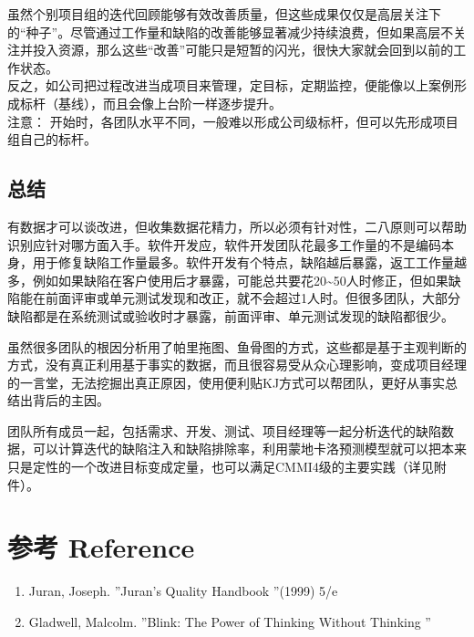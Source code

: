 虽然个别项目组的迭代回顾能够有效改善质量，但这些成果仅仅是高层关注下的``种子''。尽管通过工作量和缺陷的改善能够显著减少持续浪费，但如果高层不关注并投入资源，那么这些``改善''可能只是短暂的闪光，很快大家就会回到以前的工作状态。\\
反之，如公司把过程改进当成项目来管理，定目标，定期监控，便能像以上案例形成标杆（基线），而且会像上台阶一样逐步提升。\\
注意：
开始时，各团队水平不同，一般难以形成公司级标杆，但可以先形成项目组自己的标杆。

\hypertarget{ux603bux7ed3}{%
\subsection{总结}\label{ux603bux7ed3}}

有数据才可以谈改进，但收集数据花精力，所以必须有针对性，二八原则可以帮助识别应针对哪方面入手。软件开发应，软件开发团队花最多工作量的不是编码本身，用于修复缺陷工作量最多。软件开发有个特点，缺陷越后暴露，返工工作量越多，例如如果缺陷在客户使用后才暴露，可能总共要花20\textasciitilde{}50人时修正，但如果缺陷能在前面评审或单元测试发现和改正，就不会超过1人时。但很多团队，大部分缺陷都是在系统测试或验收时才暴露，前面评审、单元测试发现的缺陷都很少。

虽然很多团队的根因分析用了帕里拖图、鱼骨图的方式，这些都是基于主观判断的方式，没有真正利用基于事实的数据，而且很容易受从众心理影响，变成项目经理的一言堂，无法挖掘出真正原因，使用便利贴KJ方式可以帮团队，更好从事实总结出背后的主因。

团队所有成员一起，包括需求、开发、测试、项目经理等一起分析迭代的缺陷数据，可以计算迭代的缺陷注入和缺陷排除率，利用蒙地卡洛预测模型就可以把本来只是定性的一个改进目标变成定量，也可以满足CMMI4级的主要实践（详见附件）。




\hypertarget{ux53c2ux8003-reference}{%
\section{参考 Reference}\label{ux53c2ux8003-reference}}

\begin{enumerate}
\tightlist
\item
  Juran, Joseph. ''Juran's Quality Handbook ''(1999) 5/e\\
\item
  Gladwell, Malcolm. ''Blink: The Power of Thinking Without Thinking ''
\end{enumerate}


